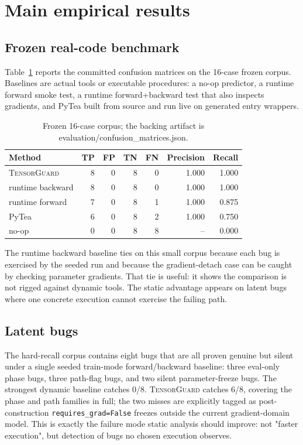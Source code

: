 \documentclass[11pt]{article}
\newcommand{\tg}{\textsc{TensorGuard}}
\begin{document}
\section{Main empirical results}

\subsection{Frozen real-code benchmark}

Table~\ref{tab:confusion} reports the committed confusion matrices on the
16-case frozen corpus.  Baselines are actual tools or executable procedures:
a no-op predictor, a runtime forward smoke test, a runtime forward+backward
test that also inspects gradients, and PyTea built from source and run live on
generated entry wrappers.

\begin{table}[h]
\centering
\small
\begin{tabular}{lrrrrrr}
\toprule
\textbf{Method} & \textbf{TP} & \textbf{FP} & \textbf{TN} & \textbf{FN}
& \textbf{Precision} & \textbf{Recall} \\
\midrule
\tg{} & 8 & 0 & 8 & 0 & 1.000 & 1.000 \\
runtime backward & 8 & 0 & 8 & 0 & 1.000 & 1.000 \\
runtime forward & 7 & 0 & 8 & 1 & 1.000 & 0.875 \\
PyTea & 6 & 0 & 8 & 2 & 1.000 & 0.750 \\
no-op & 0 & 0 & 8 & 8 & -- & 0.000 \\
\bottomrule
\end{tabular}
\caption{Frozen 16-case corpus; the backing artifact is evaluation/confusion\_matrices.json.}
\label{tab:confusion}
\end{table}

The runtime backward baseline ties on this small corpus because each bug is
exercised by the seeded run and because the gradient-detach case can be caught
by checking parameter gradients.  That tie is useful: it shows the comparison is
not rigged against dynamic tools.  The static advantage appears on latent bugs
where one concrete execution cannot exercise the failing path.

\subsection{Latent bugs}

The hard-recall corpus contains eight bugs that are all proven genuine but
silent under a single seeded train-mode forward/backward baseline: three
eval-only phase bugs, three path-flag bugs, and two silent parameter-freeze
bugs.  The strongest dynamic baseline catches 0/8.  \tg{} catches 6/8,
covering the phase and path families in full; the two misses are explicitly
tagged as post-construction \texttt{requires\_grad=False} freezes outside the
current gradient-domain model.  This is exactly the failure mode static analysis
should improve: not "faster execution", but detection of bugs no chosen
execution observes.
\end{document}
